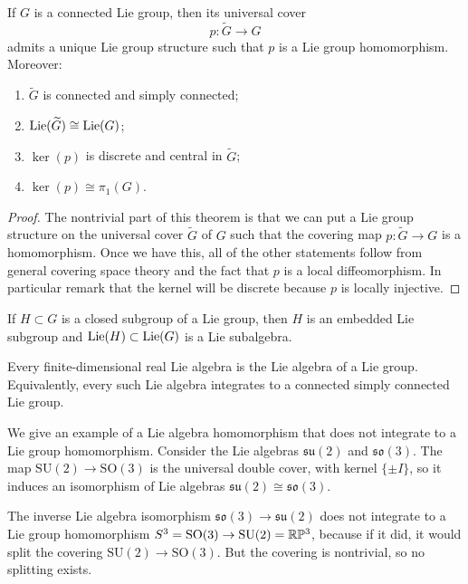 \documentclass[12pt]{article}
\begin{document}
\begin{theorem}
    If \(G\) is a connected Lie group, then its universal cover
    \[
        p:\widetilde G\to G
    \]
    admits a unique Lie group structure such that \(p\) is a Lie group homomorphism. Moreover:
    \begin{enumerate}
        \item \(\widetilde G\) is connected and simply connected;
        \item \(\operatorname{Lie}(\widetilde G)\cong \operatorname{Lie}(G)\);
        \item \(\ker(p)\) is discrete and central in \(\widetilde G\);
        \item \(\ker(p)\cong \pi_1(G)\).
    \end{enumerate}
\end{theorem}

\begin{proof}
    The nontrivial part of this theorem is that we can put a Lie group structure on the universal cover $\tilde G$ of $G$ such that the covering map $p:\tilde G \to G$ is a homomorphism. Once we have this, all of the other statements follow from general covering space theory and the fact that $p$ is a local diffeomorphism. In particular remark that the kernel will be discrete because $p$ is locally injective.
\end{proof}

\begin{theorem}
    If \(H\subset G\) is a closed subgroup of a Lie group, then \(H\) is an embedded Lie subgroup and $\operatorname{Lie}(H)\subset \operatorname{Lie}(G)$
    is a Lie subalgebra.
\end{theorem}

\begin{theorem}
    Every finite-dimensional real Lie algebra is the Lie algebra of a Lie group.
    Equivalently, every such Lie algebra integrates to a connected simply connected Lie group.
\end{theorem}

\begin{example}
    We give an example of a Lie algebra homomorphism that does not integrate to a Lie group homomorphism. Consider the Lie algebras $\mathfrak{su}(2)$ and $\mathfrak{so}(3)$. The map $\mathrm{SU}(2)\to \mathrm{SO}(3)$ is the universal double cover, with kernel $\{\pm I\}$, so it induces an isomorphism of Lie algebras $\mathfrak{su}(2)\cong\mathfrak{so}(3)$.

    The inverse Lie algebra isomorphism $\mathfrak{so}(3)\to\mathfrak{su}(2)$ does not integrate to a Lie group homomorphism $S^3 = \mathrm{SO}(3)\to \mathrm{SU}(2) = \mathbb{R}\mathbb{P}^3$, because if it did, it would split the covering $\mathrm{SU}(2)\to\mathrm{SO}(3)$. But the covering is nontrivial, so no splitting exists.
\end{example}
\end{document}
